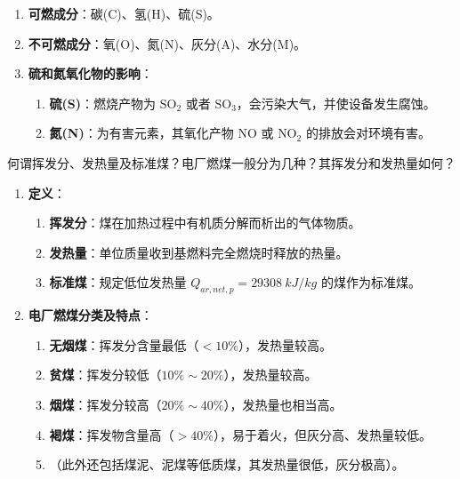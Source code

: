 \begin{solution}
\begin{enumerate}
  \item \textbf{可燃成分}：碳(C)、氢(H)、硫(S)。
  \item \textbf{不可燃成分}：氧(O)、氮(N)、灰分(A)、水分(M)。
  \item \textbf{硫和氮氧化物的影响}：
  \begin{enumerate}
    \item \textbf{硫(S)}：燃烧产物为 \(\text{SO}_2\) 或者 \(\text{SO}_3\)，会污染大气，并使设备发生腐蚀。
    \item \textbf{氮(N)}：为有害元素，其氧化产物 \(\text{NO}\) 或 \(\text{NO}_2\) 的排放会对环境有害。
  \end{enumerate}
\end{enumerate}
\end{solution}

\begin{problem}
何谓挥发分、发热量及标准煤？电厂燃煤一般分为几种？其挥发分和发热量如何？
\end{problem}

\begin{solution}
\begin{enumerate}
  \item \textbf{定义}：
  \begin{enumerate}
    \item \textbf{挥发分}：煤在加热过程中有机质分解而析出的气体物质。
    \item \textbf{发热量}：单位质量收到基燃料完全燃烧时释放的热量。
    \item \textbf{标准煤}：规定低位发热量 \(Q_{ar,net,p}=\qty{29308}{kJ/kg}\) 的煤作为标准煤。
  \end{enumerate}
  \item \textbf{电厂燃煤分类及特点}：
  \begin{enumerate}
    \item \textbf{无烟煤}：挥发分含量最低（\(<10\%\)），发热量较高。
    \item \textbf{贫煤}：挥发分较低（\(10\%\sim20\%\)），发热量较高。
    \item \textbf{烟煤}：挥发分较高（\(20\%\sim40\%\)），发热量也相当高。
    \item \textbf{褐煤}：挥发物含量高（\(>40\%\)），易于着火，但灰分高、发热量较低。
    \item （此外还包括煤泥、泥煤等低质煤，其发热量很低，灰分极高）。
  \end{enumerate}
\end{enumerate}
\end{solution}

